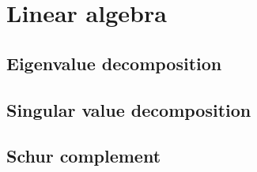 \chapter{Linear algebra}
\label{chap:linear_algebra}







\section{Eigenvalue decomposition}
\label{sec:eigenvalue_decomposition}

\section{Singular value decomposition}
\label{sec:singular_value_decomposition}



\section{Schur complement}
\label{sec:schur_complement}